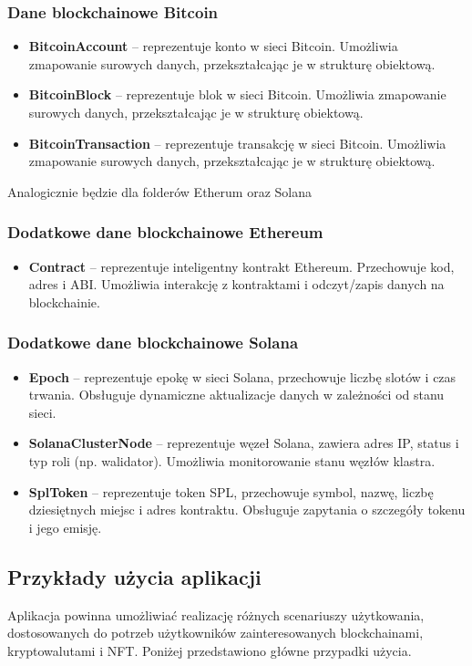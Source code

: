 \subsubsection{Dane blockchainowe Bitcoin}
\begin{itemize}
\item \textbf{BitcoinAccount} -- reprezentuje konto w sieci Bitcoin. Umożliwia zmapowanie surowych danych, przekształcając je w strukturę obiektową.
\item \textbf{BitcoinBlock} -- reprezentuje blok w sieci Bitcoin. Umożliwia zmapowanie surowych danych, przekształcając je w strukturę obiektową.
\item \textbf{BitcoinTransaction} -- reprezentuje transakcję w sieci Bitcoin. Umożliwia zmapowanie surowych danych, przekształcając je w strukturę obiektową.
\end{itemize}

Analogicznie będzie dla folderów Etherum oraz Solana
\subsubsection{Dodatkowe dane blockchainowe Ethereum}
\begin{itemize}
\item \textbf{Contract} -- reprezentuje inteligentny kontrakt Ethereum. Przechowuje kod, adres i ABI. Umożliwia interakcję z kontraktami i odczyt/zapis danych na blockchainie.
\end{itemize}

\subsubsection{Dodatkowe dane blockchainowe Solana}
\begin{itemize}
\item \textbf{Epoch} -- reprezentuje epokę w sieci Solana, przechowuje liczbę slotów i czas trwania. Obsługuje dynamiczne aktualizacje danych w zależności od stanu sieci.
\item \textbf{SolanaClusterNode} -- reprezentuje węzeł Solana, zawiera adres IP, status i typ roli (np. walidator). Umożliwia monitorowanie stanu węzłów klastra.
\item \textbf{SplToken} -- reprezentuje token SPL, przechowuje symbol, nazwę, liczbę dziesiętnych miejsc i adres kontraktu. Obsługuje zapytania o szczegóły tokenu i jego emisję.
\end{itemize}

\subsection{Przykłady użycia aplikacji}
Aplikacja powinna umożliwiać realizację różnych scenariuszy użytkowania, dostosowanych do potrzeb użytkowników zainteresowanych blockchainami, kryptowalutami i NFT. Poniżej przedstawiono główne przypadki użycia.

